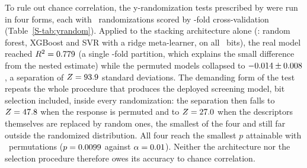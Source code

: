 To rule out chance correlation, the y-randomization tests prescribed by \citep{rucker2007} were run in four forms, each with \YRandomNPermutations\ randomizations scored by \YRandomCVFolds-fold cross-validation (Table~\ref{S-tab:yrandom}). Applied to the stacking architecture alone (\YRandomArchitecture: random forest, XGBoost and SVR with a ridge meta-learner, on all \ExpBNFeaturesTotal\ bits), the real model reached $R^2 = 0.779$ (a single \YRandomCVFolds-fold partition, which explains the small difference from the nested estimate) while the permuted models collapsed to $-0.014 \pm 0.008$, a separation of $Z = 93.9$ standard deviations. The demanding form of the test repeats the whole procedure that produces the deployed screening model, bit selection included, inside every randomization: the separation then falls to $Z = 47.8$ when the response is permuted and to $Z = 27.0$ when the descriptors themselves are replaced by random ones, the smallest of the four and still far outside the randomized distribution. All four reach the smallest $p$ attainable with \YRandomNPermutations\ permutations ($p = 0.0099$ against $\alpha = 0.01$). Neither the architecture nor the selection procedure therefore owes its accuracy to chance correlation.

